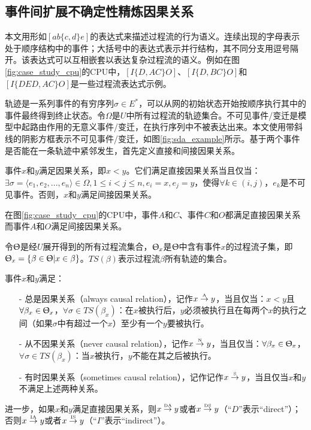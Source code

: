 \subsection{事件间扩展不确定性精炼因果关系}\label{subsec:exroru_event_causal}
本文用形如$[ab\{c,d\}e]$的表达式来描述过程流的行为语义。连续出现的字母表示处于顺序结构中的事件；大括号中的表达式表示并行结构，其不同分支用逗号隔开。该表达式可以互相嵌套以表达复杂过程流的语义。例如在图\ref{fig:case_study_cpu}的CPU中，$[I\{D,AC\}O]$、$[I\{D,BC\}O]$和$[I\{DED,AC\}O]$是一些过程流表达式示例。

轨迹是一系列事件的有穷序列$\sigma\in E^{*}$，可以从网的初始状态开始按顺序执行其中的事件最终得到终止状态。令$\Omega$是$U$中所有过程流的轨迹集合。不可见事件/变迁是模型中起路由作用的无意义事件/变迁，在执行序列中不被表达出来\cite{wen2007mining}。本文使用带斜线的阴影方框表示不可见事件/变迁，如图\ref{fig:sda_example}所示。基于两个事件是否能在一条轨迹中紧邻发生，首先定义直接和间接因果关系。

\begin{definition}[直接和间接因果关系]\label{def:exroru_event_causal_direct}
事件$x$和$y$满足因果关系，即$x<y$。它们满足直接因果关系当且仅当：$\exists\sigma=\langle e_{1},e_{2},...,e_{n}\rangle\in\Omega,1\leq i<j\leq n,e_{i}=x,e_{j}=y$，使得$\forall k\in(i,j)$，$e_{k}$是不可见事件。否则，$x$和$y$满足间接因果关系。
\end{definition}

\begin{example}\label{ex:sda}
在图\ref{fig:case_study_cpu}的CPU中，事件$A$和$C$、事件$C$和$O$都满足直接因果关系而事件$A$和$O$满足间接因果关系。
\end{example}

令$\Uptheta$是经$U$展开得到的所有过程流集合，$\Uptheta_{x}$是$\Uptheta$中含有事件$x$的过程流子集，即$\Uptheta_{x}=\{\beta\in\Uptheta|x\in\beta\}$。$TS(\beta)$表示过程流$\beta$所有轨迹的集合。

\begin{definition}[事件间扩展不确定性精炼因果关系]\label{def:exroru_event_causal}
事件$x$和$y$满足：
  \begin{itemize}
  	\item[-] 总是因果关系（always causal relation），记作$x\overset{\text{\tiny{A}}}{\rightarrow}y$，当且仅当：$x<y$且$\forall\beta_{x}\in\Uptheta_{x}$，$\forall\sigma\in TS(\beta_{x})$：在$x$被执行后，$y$必须被执行且在每两个$x$的执行之间（如果$\sigma$中有超过一个$x$）至少有一个$y$要被执行。
  	\item[-] 从不因果关系（never causal relation），记作$x\overset{\text{\tiny{N}}}{\rightarrow}y$，当且仅当：$\forall\beta_{x}\in\Uptheta_{x}$，$\forall\sigma\in TS(\beta_{x})$：当$x$被执行，$y$不能在其之后被执行。
  	\item[-] 有时因果关系（sometimes causal relation），记作记作$x\overset{\text{\tiny{S}}}{\rightarrow}y$，当且仅当$x$和$y$不满足上述两种关系。
  \end{itemize}
进一步，如果$x$和$y$满足直接因果关系，则$x\overset{\text{\tiny{DA}}}{\rightarrow}y$或者$x\overset{\text{\tiny{DS}}}{\rightarrow}y$（“$D$”表示“direct”）；否则$x\overset{\text{\tiny{IA}}}{\rightarrow}y$或者$x\overset{\text{\tiny{IS}}}{\rightarrow}y$（“$I$”表示“indirect”）。
\end{definition}

